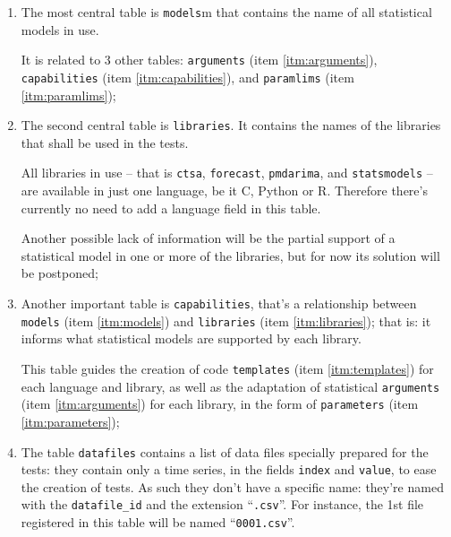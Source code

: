 \documentclass[a4paper,10pt]{article}
\begin{document}
\begin{enumerate}
    \item \label{itm:models}
        The most central table is {\tt models}m that contains
        the name of all statistical models in use.

        It is related to 3 other tables: {\tt arguments} (item
        \ref{itm:arguments}), {\tt capabilities} (item
        \ref{itm:capabilities}), and {\tt paramlims} (item
        \ref{itm:paramlims});

    \item \label{itm:libraries}
        The second central table is {\tt libraries}. It contains
        the names of the libraries that shall be used in the tests.

        All libraries in use -- that is {\tt ctsa},
        {\tt forecast}, {\tt pmdarima}, and {\tt statsmodels} --
        are available in just one language, be it C, Python or R.
        Therefore there's currently no need to add a language field
        in this table.

        Another possible lack of information will be the partial
        support of a statistical model in one or more of the
        libraries, but for now its solution will be postponed;

    \item \label{itm:capabilities}
        Another important table is {\tt capabilities}, that's a
        relationship between {\tt models} (item \ref{itm:models})
        and {\tt libraries} (item \ref{itm:libraries}); that is:
        it informs what statistical models are supported by each
        library.

        This table guides the creation of code {\tt templates}
        (item \ref{itm:templates}) for each language and library,
        as well as the adaptation of statistical {\tt arguments}
        (item \ref{itm:arguments}) for each library, in the form
        of {\tt parameters} (item \ref{itm:parameters});

    \item \label{itm:datafiles}
        The table {\tt datafiles} contains a list of data files
        specially prepared for the tests: they contain only a time
        series, in the fields {\tt index} and {\tt value}, to
        ease the creation of tests. As such they don't have a
        specific name: they're named with the {\tt datafile\_id}
        and the extension ``{\tt .csv}''. For instance, the 1st
        file registered in this table will be named
        ``{\tt 0001.csv}''.


\end{enumerate}
\end{document}
